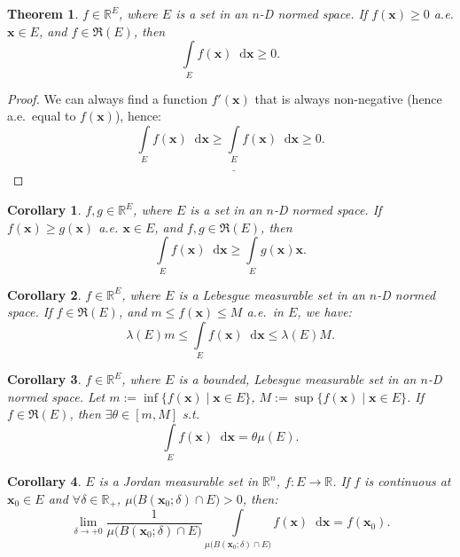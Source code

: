 \documentclass[openany]{book}
\theoremstyle{plain}
\newtheorem{theorem}{Theorem}[section] %
\newtheorem{corollary}{Corollary} %
\theoremstyle{definition}
\newcommand{\dif}{\mathop{}\!\mathrm{d}} %
\newcommand*{\bv}{\boldsymbol} %
\begin{document}
\begin{theorem}\label{theorem: the integral of a non-negative function is also non-negative}
	$f \in \mathbb R^E$, where $E$ is a set in an $n$-D normed space.
	If $f(\bv x) \geq 0$ a.e. $\bv x \in E$, and $f \in \mathfrak R(E)$, then
	\begin{equation*}
		\int\limits_E f(\bv x) \dif \bv x \geq 0.
	\end{equation*}
\end{theorem}
\begin{proof}
	We can always find a function $f'(\bv x)$ that is always non-negative (hence a.e.\ equal to $f(\bv x)$), hence:
	\begin{equation*}
		\int\limits_E f(\bv x) \dif \bv x 
			\geq \underline{\int\limits_E} f(\bv x) \dif \bv x \geq 0.
	\end{equation*}
\end{proof}

\begin{corollary}
	$f, g \in \mathbb R^E$, where $E$ is a set in an $n$-D normed space.
	If $f(\bv x) \geq g(\bv x)$ a.e. $\bv x \in E$, and $f, g \in \mathfrak R(E)$, then
	\begin{equation*}
		\int\limits_E f(\bv x) \dif \bv x \geq \int\limits_E g(\bv x) \bv x.
	\end{equation*}
\end{corollary}

\begin{corollary}\label{corollary: integral average}
	$f \in \mathbb R^E$, where $E$ is a Lebesgue measurable set in an $n$-D normed space. 
	If $f \in \mathfrak R(E)$, and $m \leq f(\bv x) \leq M$ a.e.\ in $E$, we have:
	\begin{equation*}
		\lambda(E) m \leq \int\limits_E f(\bv x) \dif \bv x \leq \lambda(E) M.
	\end{equation*}
\end{corollary}

\begin{corollary}
	$f \in \mathbb R^E$, where $E$ is a bounded, Lebesgue measurable set in an $n$-D normed space. 
	Let $m := \inf\{f(\bv x) \mid \bv x \in E\}$, $M := \sup\{f(\bv x) \mid \bv x \in E\}$.
	If $f \in \mathfrak R(E)$, then $\exists \theta \in [m, M]$ s.t.\ 
	\begin{equation*}
		\int\limits_E f(\bv x) \dif \bv x = \theta \mu(E).
	\end{equation*}
\end{corollary}

\begin{corollary}
	$E$ is a Jordan measurable set in $\mathbb R^n$, $f \colon E \to \mathbb R$. 
	If $f$ is continuous at $\bv x_0 \in E$ and $\forall \delta \in \mathbb R_+$, $\mu \big( B(\bv x_0; \delta) \cap E) > 0$, then:
	\begin{equation*}
		\lim_{\delta \to +0} \frac{1}{\mu \big( B(\bv x_0; \delta) \cap E)} \int\limits_{\mu \big( B(\bv x_0; \delta) \cap E)} f(\bv x) \dif \bv x = f(\bv x_0).
	\end{equation*} 
\end{corollary}
\end{document}
